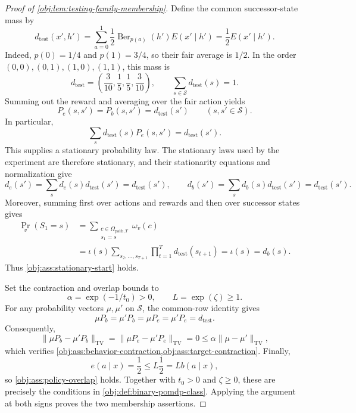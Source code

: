 \documentclass[11pt]{article}
\begin{document}
\begin{proof}[Proof of \cref{obj:lem:testing-family-membership}]
Define the common successor-state mass by
\[
d_{\mathrm{test}}(x',h')
=
\sum_{a=0}^1\frac12
\operatorname{Ber}_{p(a)}(h')E(x'\mid h')
=\frac12E(x'\mid h').
\]
Indeed, \(p(0)=1/4\) and \(p(1)=3/4\), so their fair average is \(1/2\). In the order
\((0,0),(0,1),(1,0),(1,1)\), this mass is
\[
d_{\mathrm{test}}
=\left(\frac3{10},\frac15,\frac15,\frac3{10}\right),
\qquad
\sum_{s\in\mathcal S}d_{\mathrm{test}}(s)=1.
\]
Summing out the reward and averaging over the fair action yields
\[
P_e(s,s')=P_b(s,s')=d_{\mathrm{test}}(s')
\qquad(s,s'\in\mathcal S).
\]
In particular,
\[
\sum_s d_{\mathrm{test}}(s)P_e(s,s')
=d_{\mathrm{test}}(s').
\]
This supplies a stationary probability law. The stationary laws used by the experiment are therefore stationary, and their stationarity equations and normalization give
\[
d_e(s')
=\sum_s d_e(s)d_{\mathrm{test}}(s')
=d_{\mathrm{test}}(s'),
\qquad
d_b(s')
=\sum_s d_b(s)d_{\mathrm{test}}(s')
=d_{\mathrm{test}}(s').
\]
Moreover, summing first over actions and rewards and then over successor states gives
\[
\begin{aligned}
\Pr_v(S_1=s)
&=\sum_{\substack{c\in\Omega_{\mathrm{path},T}\\s_1=s}}\omega_v(c)\\
&=\iota(s)
  \sum_{s_2,\ldots,s_{T+1}}
       \prod_{t=1}^T d_{\mathrm{test}}(s_{t+1})
=\iota(s)=d_b(s).
\end{aligned}
\]
Thus \cref{obj:ass:stationary-start} holds.

Set the contraction and overlap bounds to
\[
\alpha=\exp(-1/t_0)>0,\qquad L=\exp(\zeta)\geq1.
\]
For any probability vectors \(\mu,\mu'\) on \(\mathcal S\), the common-row identity gives
\[
\mu P_b=\mu'P_b=\mu P_e=\mu'P_e=d_{\mathrm{test}}.
\]
Consequently,
\[
\|\mu P_b-\mu'P_b\|_{\mathrm{TV}}
=
\|\mu P_e-\mu'P_e\|_{\mathrm{TV}}
=0
\leq\alpha\|\mu-\mu'\|_{\mathrm{TV}},
\]
which verifies
\cref{obj:ass:behavior-contraction,obj:ass:target-contraction}.
Finally,
\[
e(a\mid x)=\frac12
\leq L\frac12=Lb(a\mid x),
\]
so \cref{obj:ass:policy-overlap} holds. Together with \(t_0>0\) and \(\zeta\geq0\), these are precisely the conditions in
\cref{obj:def:binary-pomdp-class}. Applying the argument at both signs proves the two membership assertions.


\end{proof}
\end{document}
